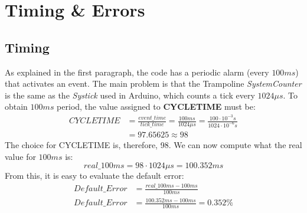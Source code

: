 \documentclass[a4paper]{article}
\begin{document}
\section{Timing \& Errors}
\subsection{Timing} \label{Timing}
As explained in the first paragraph, the code has a periodic alarm (every \(100ms\)) that activates an event. The main problem is that the Trampoline \emph{SystemCounter} is the same as the \emph{Systick} used in Arduino, which counts a tick every \(1024 \mu s\). To obtain \(100ms\) period, the value assigned to  \textbf{CYCLETIME} must be:
\begin{align*}
  CYCLETIME & = \frac{event\_time}{tick\_time} = \frac{100ms}{1024\mu s} = \frac{100 \cdot 10^{-3} s}{1024 \cdot 10^{-6} s} \\[0.5ex]
            & = 97.65625 \approx 98
\end{align*}
The choice for CYCLETIME is, therefore, 98. We can now compute what the real value for \(100ms\) is:
\begin{equation*}
  real\_100ms = 98 \cdot 1024\mu s = 100.352ms
\end{equation*}
From this, it is easy to evaluate the default error:
\begin{align}
  Default\_Error & = \frac{real\_100ms - 100ms}{100ms}                  \label{Default_Error1} \\[0.5ex]
  Default\_Error & = \frac{100.352ms - 100ms}{100ms} = 0.352\%    \label{Default_Error2}
\end{align}
\end{document}
